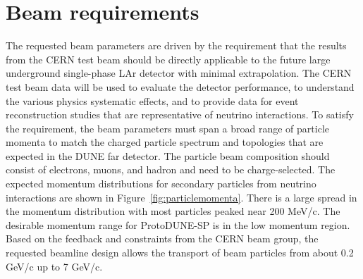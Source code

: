 \section{Beam requirements}
\label{sec:beamrequirements}

The requested beam parameters are driven by the requirement that the results from the CERN test beam should be directly applicable to the future large underground single-phase LAr detector with minimal extrapolation. The CERN test beam data will be used to evaluate the detector performance, to understand the various physics systematic effects, and to provide data for event reconstruction studies that are representative of neutrino interactions. To satisfy the requirement, the beam parameters must span a broad range of particle momenta to match the charged particle spectrum and topologies that are expected in the DUNE far detector. The particle beam composition should consist of electrons, muons, and hadron and need to be charge-selected. The expected momentum distributions for secondary particles from neutrino interactions are shown in Figure~\ref{fig:particlemomenta}. There is a large spread in the momentum distribution with most particles peaked near 200 MeV/c.  
The desirable momentum range for ProtoDUNE-SP  is in the low momentum region. Based on the feedback and constraints from the CERN beam group, the requested beamline design allows the transport of beam particles from about 0.2 GeV/c up to 7 GeV/c. 

